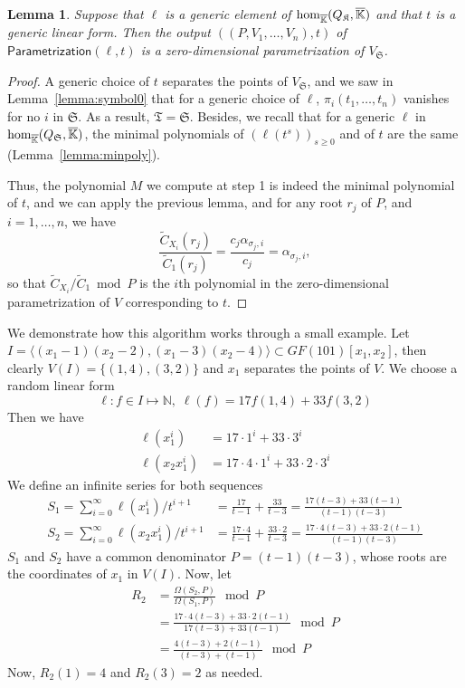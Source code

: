 \documentclass[12pt]{article}
\newtheorem{Lemma}{Lemma}
\def\Kbar {{\ensuremath{\overline{\mathbb{K}}}}}
\begin{document}
\begin{Lemma}
	Suppose that $\ell$ is a generic element of ${\rm
		hom}_{\Kbar}(Q_\mathfrak{K},\Kbar)$ and that $t$ is a generic
	linear form. Then the output $((P,V_1,\dots,V_n),t)$ of
	$\mathsf{Parametrization}(\ell,t)$ is a zero-dimensional
	parametrization of $V_{\mathfrak{S}}$.
\end{Lemma}
\begin{proof}
	A generic choice of $t$ separates the points of $V_{\mathfrak{S}}$,
	and we saw in Lemma~\ref{lemma:symbol0} that for a generic choice of
	$\ell$, $\pi_i(t_1,\dots,t_n)$ vanishes for no $i$ in
	$\mathfrak{S}$.  As a result, $\mathfrak{T}=\mathfrak{S}$.  Besides,
	we recall that for a generic $\ell$ in ${\rm
		hom}_{\Kbar}(Q_\mathfrak{S},\Kbar)$, the minimal polynomials of
	$(\ell(t^s))_{s \ge 0}$ and of $t$ are the same
	(Lemma~\ref{lemma:minpoly}).
	
	Thus, the polynomial $M$ we compute at step 1 is indeed the minimal
	polynomial of $t$, and we can apply the previous lemma, and for 
	any root $r_j$ of $P$, and $i=1,\dots,n$, we have
	$$\frac{\tilde C_{X_i}(r_j)}{\tilde C_1(r_j)}  = \frac{c_j \alpha_{\sigma_j,i}}{c_j} = \alpha_{\sigma_j,i},$$
	so that $\tilde C_{X_i}/\tilde C_1 \bmod P$ is the $i$th polynomial in
	the zero-dimensional parametrization of $V$ corresponding to $t$.
\end{proof}

We demonstrate how this algorithm works through a small example. Let 
$I = \langle (x_1-1)(x_2-2),(x_1-3)(x_2-4)\rangle \subset
GF(101)[x_1,x_2]$, then
clearly $V(I) = \{ (1,4),(3,2) \}$ and $x_1$ separates the
points of $V$. We choose a random linear form 
$$\ell: f \in I \mapsto \mathbb{N},\;\ell(f) = 17 f(1,4) + 33 f(3,2)$$
Then we have
\begin{align*}
\ell(x_1^i) &= 17 \cdot 1^i + 33 \cdot 3^i\\
\ell(x_2x_1^i) &= 17 \cdot 4 \cdot 1^i + 33 \cdot 2 \cdot 3^i
\end{align*} 
We define an infinite series for both sequences
\begin{align*}
S_1 = \sum_{i = 0}^{\infty} \ell(x^i_1) / t^{i+1}
&= \frac{17}{t-1} + \frac{33}{t-3}
= \frac{17(t-3)+33(t-1)}{(t-1)(t-3)} \\
S_2 = \sum_{i=0}^{\infty} \ell(x_2x^i_1)/t^{i+1} 
&= \frac{17\cdot 4}{t-1} + \frac{33 \cdot 2}{t-3}
= \frac{17\cdot 4 (t-3) + 33\cdot 2(t-1)}{(t-1)(t-3)}
\end{align*}
$S_1$ and $S_2$ have a common denominator $P = (t-1)(t-3)$,
whose roots are the coordinates of $x_1$ in $V(I)$. Now, let
\begin{align*}
R_2 
&=\frac{\Omega(S_2,P)}{\Omega(S_1,P)} \mod P\\
&= 
\frac{17\cdot 4 (t-3) + 33\cdot 2(t-1)}{17(t-3)+33(t-1)} \mod P\\
&=\frac{4 (t-3) + 2(t-1)}{(t-3)+(t-1)} \mod P
\end{align*}
Now, $ R_2(1) = 4$ and $R_2(3) = 2$ as needed.
\end{document}
